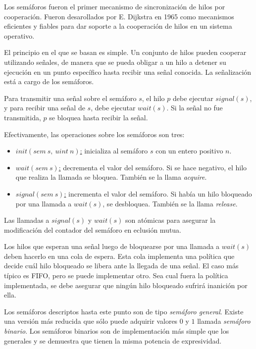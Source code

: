 Los semáforos fueron el primer mecanismo de sincronización de hilos por
cooperación. Fueron desarollados por E. Dijkstra en 1965 como mecanismos
eficientes y fiables para dar soporte a la cooperación de hilos en un sistema
operativo.

El principio en el que se basan es simple. Un conjunto de hilos pueden
cooperar utilizando señales, de manera que se pueda obligar a un hilo a
detener su ejecución en un punto específico hasta recibir una señal conocida.
La señalización está a cargo de los semáforos.

Para transmitir una señal sobre el semáforo $s$, el hilo $p$ debe ejecutar
$signal(s)$, y para recibir una señal de $s$, debe ejecutar $wait(s)$. Si la
señal no fue transmitida, $p$ se bloquea hasta recibir la señal.

Efectivamente, las operaciones sobre los semáforos son tres:
\begin{itemize}
    \item \underline{$init(sem\ s,\ uint\ n)$:} inicializa al semáforo $s$ con
    un entero positivo $n$.
    \item \underline{$wait(sem\ s)$:} decrementa el valor del semáforo. Si se
    hace negativo, el hilo que realiza la llamada se bloquea. También se la
    llama \textit{acquire}.
    \item \underline{$signal(sem\ s)$:} incrementa el valor del semáforo. Si
    había un hilo bloqueado por una llamada a $wait(s)$, se desbloquea. También
    se la llama \textit{release}.
\end{itemize}

Las llamadas a $signal(s)$ y $wait(s)$ son atómicas para asegurar la
modificación del contador del semáforo en eclusión mutua.

Los hilos que esperan una señal luego de bloquearse por una llamada a
$wait(s)$ deben hacerlo en una cola de espera. Esta cola implementa una política
que decide cuál hilo bloqueado se libera ante la llegada de una señal. El
caso más típico es FIFO, pero se puede implementar otro. Sea cual fuera la
política implementada, se debe asegurar que ningún hilo bloqueado sufrirá
inanición por ella.

Los semáforos descriptos hasta este punto son de tipo \textit{semáforo
general}.
Existe una versión más reducida que sólo puede adquirir valores $0$ y $1$ llamada
\textit{semáforo binario}. Los semáforos binarios son de implementación más
simple que los generales y se demuestra que tienen la misma potencia de
expresividad. \cite{SistOpStallings}

